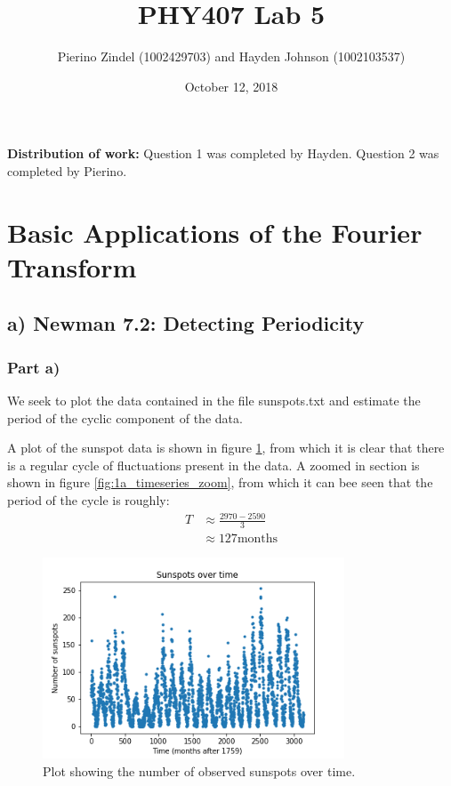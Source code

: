 \documentclass{article}
\title{PHY407 Lab 5}
\author{Pierino Zindel (1002429703) and Hayden Johnson (1002103537)}
\date{October 12, 2018}
\begin{document}
\maketitle

\noindent \textbf{Distribution of work:} Question 1 was completed by Hayden. Question 2 was completed by Pierino.

\section{Basic Applications of the Fourier Transform}

\subsection{a) Newman 7.2: Detecting Periodicity}

\subsubsection{Part a)}

We seek to plot the data contained in the file sunspots.txt and estimate the period of the cyclic component of the data.

A plot of the sunspot data is shown in figure \ref{fig:1a_timeseries}, from which it is clear that there is a regular cycle of fluctuations present in the data. A zoomed in section is shown in figure \ref{fig:1a_timeseries_zoom}, from which it can bee seen that the period of the cycle is roughly:
\begin{align*}
	T &\approx \frac{2970 - 2590}{3} \\
	&\approx 127 \text{months}
\end{align*}

\begin{figure}[H]
	\centering
	\includegraphics[width=0.8\textwidth]{../images/1a_timeseries.png}
	\caption{Plot showing the number of observed sunspots over time.}
	\label{fig:1a_timeseries}
\end{figure}
\end{document}
